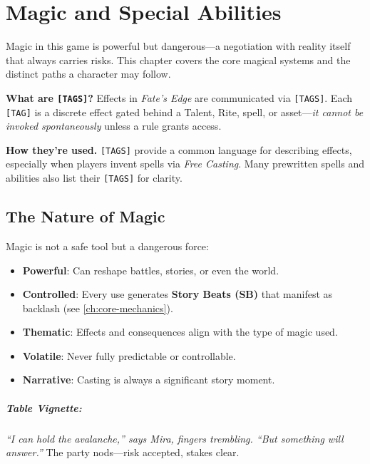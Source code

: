 \chapter{Magic and Special Abilities}
\label{ch:magic}

Magic in this game is powerful but dangerous---a negotiation with reality itself that always carries risks. This chapter covers the core magical systems and the distinct paths a character may follow.

\begin{tcolorbox}[colback=black!3!white,colframe=black!40!white,title={Sidebar: \texttt{[TAGS]} \& Magic},enhanced]
  \textbf{What are \texttt{[TAGS]}?} Effects in \textit{Fate's Edge} are communicated via \texttt{[TAGS]}. Each \texttt{[TAG]} is a discrete effect gated behind a Talent, Rite, spell, or asset---\emph{it cannot be invoked spontaneously} unless a rule grants access.
  
  \medskip
  \textbf{How they're used.} \texttt{[TAGS]} provide a common language for describing effects, especially when players invent spells via \emph{Free Casting}. Many prewritten spells and abilities also list their \texttt{[TAGS]} for clarity.
\end{tcolorbox}

\section{The Nature of Magic}
\label{sec:magic-nature}

Magic is not a safe tool but a dangerous force:
\begin{itemize}
\item \textbf{Powerful}: Can reshape battles, stories, or even the world.
\item \textbf{Controlled}: Every use generates \textbf{Story Beats (SB)} that manifest as backlash (see \ref{ch:core-mechanics}).
\item \textbf{Thematic}: Effects and consequences align with the type of magic used.
\item \textbf{Volatile}: Never fully predictable or controllable.
\item \textbf{Narrative}: Casting is always a significant story moment.
\end{itemize}

\paragraph{Table Vignette:}
\emph{``I can hold the avalanche,'' says Mira, fingers trembling. ``But something will answer.''} The party nods---risk accepted, stakes clear.


